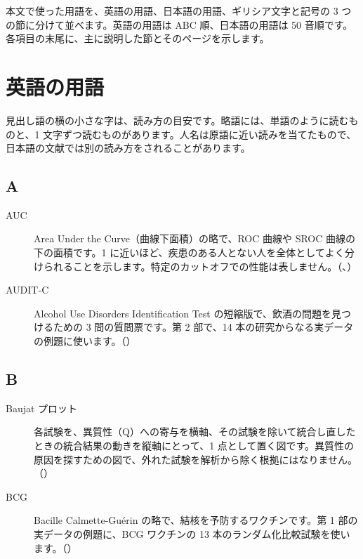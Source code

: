 \begin{chapintro}
本文で使った用語を、英語の用語、日本語の用語、ギリシア文字と記号の 3 つの節に分けて並べます。英語の用語は ABC 順、日本語の用語は 50 音順です。各項目の末尾に、主に説明した節とそのページを示します。
\end{chapintro}

\section{英語の用語}
\label{sec:B-1}

見出し語の横の小さな字は、読み方の目安です。略語には、単語のように読むものと、1 文字ずつ読むものがあります。人名は原語に近い読みを当てたもので、日本語の文献では別の読み方をされることがあります。

\subsection*{A}
\begin{description}
\item[AUC] Area Under the Curve（曲線下面積）の略で、ROC 曲線や SROC 曲線の下の面積です。1 に近いほど、疾患のある人とない人を全体としてよく分けられることを示します。特定のカットオフでの性能は表しません。（、）
\item[AUDIT-C] Alcohol Use Disorders Identification Test の短縮版で、飲酒の問題を見つけるための 3 問の質問票です。第 2 部で、14 本の研究からなる実データの例題に使います。（）
\end{description}

\subsection*{B}
\begin{description}
\item[Baujat プロット] 各試験を、異質性（Q）への寄与を横軸、その試験を除いて統合し直したときの統合結果の動きを縦軸にとって、1 点として置く図です。異質性の原因を探すための図で、外れた試験を解析から除く根拠にはなりません。（）
\item[BCG] Bacille Calmette-Guérin の略で、結核を予防するワクチンです。第 1 部の実データの例題に、BCG ワクチンの 13 本のランダム化比較試験を使います。（）
\end{description}

